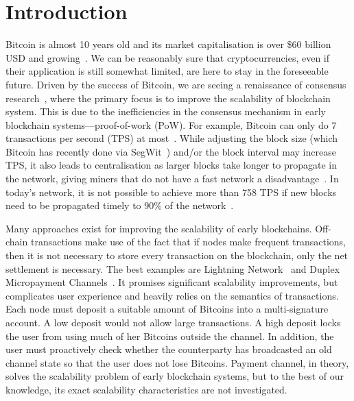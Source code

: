 \section{Introduction}

Bitcoin is almost 10 years old and its market capitalisation is over \$60 billion USD and growing~\cite{bitcoinmarketcap}.
We can be reasonably sure that cryptocurrencies,
even if their application is still somewhat limited,
are here to stay in the foreseeable future.
Driven by the success of Bitcoin, we are seeing a renaissance of consensus research~\cite{miller2016honey, kogias2016enhancing, kokoris2017omniledger},
where the primary focus is to improve the scalability of blockchain system.
This is due to the inefficiencies in the consensus mechanism in early blockchain systems---proof-of-work (PoW).
For example, Bitcoin can only do 7 transactions per second (TPS) at most~\cite{vukolic2015quest}.
While adjusting the block size (which Bitcoin has recently done via SegWit~\cite{segwit}) and/or the block interval may increase TPS,
it also leads to centralisation as larger blocks take longer to propagate in the network,
giving miners that do not have a fast network a disadvantage~\cite{croman2016scaling}.
In today's network, it is not possible to achieve more than 758 TPS
if new blocks need to be propagated timely to 90\% of the network~\cite{croman2016scaling}.

Many approaches exist for improving the scalability of early blockchains.
Off-chain transactions make use of the fact that if nodes make frequent transactions,
then it is not necessary to store every transaction on the blockchain,
only the net settlement is necessary.
The best examples are Lightning Network~\cite{lightningnetwork} and Duplex Micropayment Channels~\cite{decker2015fast}.
It promises significant scalability improvements,
but complicates user experience and heavily relies on the semantics of transactions.
Each node must deposit a suitable amount of Bitcoins into a multi-signature account.
A low deposit would not allow large transactions.
A high deposit locks the user from using much of her Bitcoins outside the channel.
In addition, the user must proactively check whether the counterparty has broadcasted an old channel state so that the user does not lose Bitcoins.
Payment channel, in theory, solves the scalability problem of early blockchain systems,
but to the best of our knowledge, its exact scalability characteristics are not investigated.

